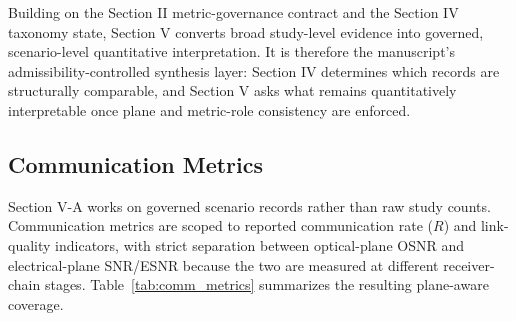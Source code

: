 \documentclass[letterpaper,journal]{IEEEtran}
\begin{document}
Building on the Section II metric-governance contract and the Section IV taxonomy state, Section V converts broad study-level evidence into governed, scenario-level quantitative interpretation. It is therefore the manuscript's admissibility-controlled synthesis layer: Section IV determines which records are structurally comparable, and Section V asks what remains quantitatively interpretable once plane and metric-role consistency are enforced.

\subsection{Communication Metrics}
Section V-A works on governed scenario records rather than raw study counts. Communication metrics are scoped to reported communication rate ($R$) and link-quality indicators, with strict separation between optical-plane OSNR and electrical-plane SNR/ESNR because the two are measured at different receiver-chain stages. Table~\ref{tab:comm_metrics} summarizes the resulting plane-aware coverage.
\end{document}
